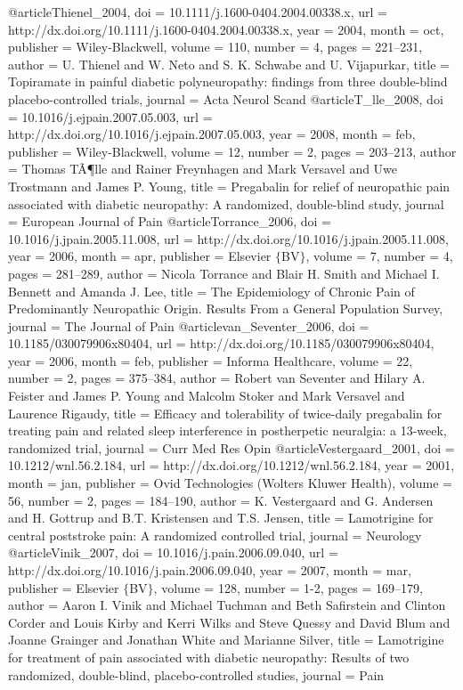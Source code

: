 @article{Thienel_2004,
	doi = {10.1111/j.1600-0404.2004.00338.x},
	url = {http://dx.doi.org/10.1111/j.1600-0404.2004.00338.x},
	year = 2004,
	month = {oct},
	publisher = {Wiley-Blackwell},
	volume = {110},
	number = {4},
	pages = {221--231},
	author = {U. Thienel and W. Neto and S. K. Schwabe and U. Vijapurkar},
	title = {Topiramate in painful diabetic polyneuropathy: findings from three double-blind placebo-controlled trials},
	journal = {Acta Neurol Scand}
}
@article{T_lle_2008,
	doi = {10.1016/j.ejpain.2007.05.003},
	url = {http://dx.doi.org/10.1016/j.ejpain.2007.05.003},
	year = 2008,
	month = {feb},
	publisher = {Wiley-Blackwell},
	volume = {12},
	number = {2},
	pages = {203--213},
	author = {Thomas TÃ¶lle and Rainer Freynhagen and Mark Versavel and Uwe Trostmann and James P. Young},
	title = {Pregabalin for relief of neuropathic pain associated with diabetic neuropathy: A randomized, double-blind study},
	journal = {European Journal of Pain}
}
@article{Torrance_2006,
	doi = {10.1016/j.jpain.2005.11.008},
	url = {http://dx.doi.org/10.1016/j.jpain.2005.11.008},
	year = 2006,
	month = {apr},
	publisher = {Elsevier $\lbrace$BV$\rbrace$},
	volume = {7},
	number = {4},
	pages = {281--289},
	author = {Nicola Torrance and Blair H. Smith and Michael I. Bennett and Amanda J. Lee},
	title = {The Epidemiology of Chronic Pain of Predominantly Neuropathic Origin. Results From a General Population Survey},
	journal = {The Journal of Pain}
}
@article{van_Seventer_2006,
	doi = {10.1185/030079906x80404},
	url = {http://dx.doi.org/10.1185/030079906x80404},
	year = 2006,
	month = {feb},
	publisher = {Informa Healthcare},
	volume = {22},
	number = {2},
	pages = {375--384},
	author = {Robert van Seventer and Hilary A. Feister and James P. Young and Malcolm Stoker and Mark Versavel and Laurence Rigaudy},
	title = {Efficacy and tolerability of twice-daily pregabalin for treating pain and related sleep interference in postherpetic neuralgia: a 13-week, randomized trial},
	journal = {Curr Med Res Opin}
}
@article{Vestergaard_2001,
	doi = {10.1212/wnl.56.2.184},
	url = {http://dx.doi.org/10.1212/wnl.56.2.184},
	year = 2001,
	month = {jan},
	publisher = {Ovid Technologies (Wolters Kluwer Health)},
	volume = {56},
	number = {2},
	pages = {184--190},
	author = {K. Vestergaard and G. Andersen and H. Gottrup and B.T. Kristensen and T.S. Jensen},
	title = {Lamotrigine for central poststroke pain: A randomized controlled trial},
	journal = {Neurology}
}
@article{Vinik_2007,
	doi = {10.1016/j.pain.2006.09.040},
	url = {http://dx.doi.org/10.1016/j.pain.2006.09.040},
	year = 2007,
	month = {mar},
	publisher = {Elsevier $\lbrace$BV$\rbrace$},
	volume = {128},
	number = {1-2},
	pages = {169--179},
	author = {Aaron I. Vinik and Michael Tuchman and Beth Safirstein and Clinton Corder and Louis Kirby and Kerri Wilks and Steve Quessy and David Blum and Joanne Grainger and Jonathan White and Marianne Silver},
	title = {Lamotrigine for treatment of pain associated with diabetic neuropathy: Results of two randomized, double-blind, placebo-controlled studies},
	journal = {Pain}
}
